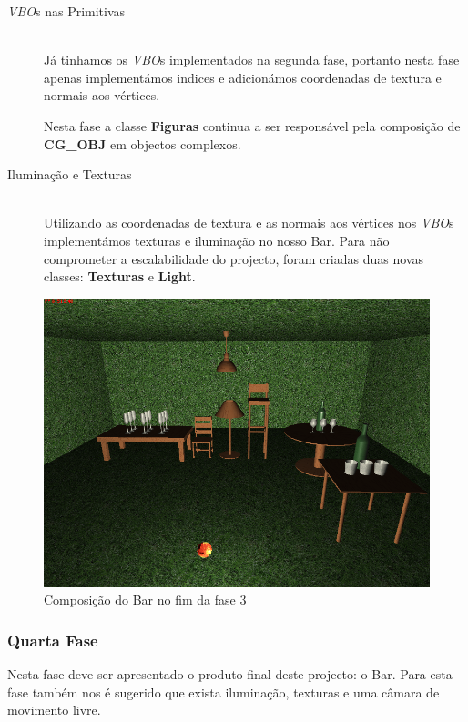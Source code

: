 \documentclass[a5paper,onecolumn, 11pt]{article}
\begin{document}
\begin{description}
	\item[\textit{VBO}s nas Primitivas] \hfill \\
	Já tinhamos os \textit{VBO}s implementados na segunda fase, portanto nesta fase apenas implementámos indices e adicionámos coordenadas de textura e normais aos vértices.
	
	Nesta fase a classe \textbf{Figuras} continua a ser responsável pela composição de \textbf{CG\_OBJ} em objectos complexos.
	
	\item[Iluminação e Texturas] \hfill \\
	Utilizando as coordenadas de textura e as normais aos vértices nos \textit{VBO}s implementámos texturas e iluminação no nosso Bar. Para não comprometer a escalabilidade do projecto, foram criadas duas novas classes: \textbf{Texturas} e \textbf{Light}. 

\end{description}
\newpage

\begin{figure}[!htb]
    \centering
    \includegraphics[scale=0.5]{fase3.png}
    \caption{Composição do Bar no fim da fase 3}
\end{figure}

\clearpage
\subsubsection{Quarta Fase}
Nesta fase deve ser apresentado o produto final deste projecto: o Bar. Para esta fase também nos é sugerido que exista iluminação, texturas e uma câmara de movimento livre.
\end{document}
